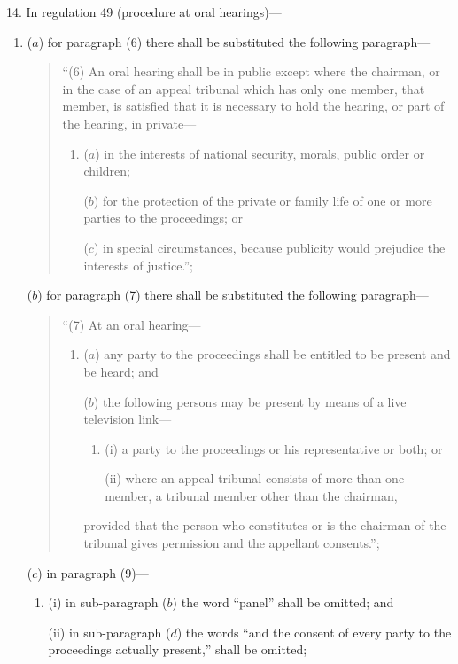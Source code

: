 \documentclass[12pt,a4paper]{article}
\begin{document}
14.  In regulation 49 (procedure at oral hearings)—
\begin{enumerate}\item[]
($a$) for paragraph (6) there shall be substituted the following paragraph—
\begin{quotation}
“(6) An oral hearing shall be in public except where the chairman, or in the case of an appeal tribunal which has only one member, that member, is satisfied that it is necessary to hold the hearing, or part of the hearing, in private—
\begin{enumerate}\item[]
($a$) in the interests of national security, morals, public order or children;

($b$) for the protection of the private or family life of one or more parties to the proceedings; or

($c$) in special circumstances, because publicity would prejudice the interests of justice.”;
\end{enumerate}
\end{quotation}

($b$) for paragraph (7) there shall be substituted the following paragraph—
\begin{quotation}
“(7) At an oral hearing—
\begin{enumerate}\item[]
($a$) any party to the proceedings shall be entitled to be present and be heard; and

($b$) the following persons may be present by means of a live television link—
\begin{enumerate}\item[]
(i) a party to the proceedings or his representative or both; or

(ii) where an appeal tribunal consists of more than one member, a tribunal member other than the chairman,
\end{enumerate}
provided that the person who constitutes or is the chairman of the tribunal gives permission and the appellant consents.”;
\end{enumerate}
\end{quotation}

($c$) in paragraph (9)—
\begin{enumerate}\item[]
(i) in sub-paragraph ($b$)  the word “panel” shall be omitted; and

(ii) in sub-paragraph ($d$)  the words “and the consent of every party to the proceedings actually present,” shall be omitted;
\end{enumerate}


\end{enumerate}
\end{document}
